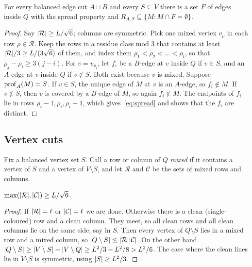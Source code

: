 \begin{lemma}\label{lem:select-edge}
For every balanced edge cut $A\sqcup B$ and every $S\subseteq V$ there is a set $F$ of edges inside $Q$ with the spread property and $R_{A,S}\subseteq\{M:M\cap F=\emptyset\}$.
\end{lemma}

\begin{proof}
Say $\lvert \mathcal R\rvert\ge L/\sqrt6$; columns are symmetric. Pick one mixed vertex $v_\rho$ in each row $\rho\in\mathcal R$. Keep the rows in a residue class mod $3$ that contains at least $\lvert \mathcal R\rvert/3\ge L/(3\sqrt6)$ of them, and index them $\rho_1<\rho_2<\dots<\rho_t$, so that $\rho_j-\rho_i\ge3(j-i)$. For $v=v_{\rho_i}$, let $f_i$ be a $B$-edge at $v$ inside $Q$ if $v\in S$, and an $A$-edge at $v$ inside $Q$ if $v\notin S$. Both exist because $v$ is mixed. Suppose $\operatorname{prof}_A(M)=S$. If $v\in S$, the unique edge of $M$ at $v$ is an $A$-edge, so $f_i\notin M$. If $v\notin S$, then $v$ is covered by a $B$-edge of $M$, so again $f_i\notin M$. The endpoints of $f_i$ lie in rows $\rho_i-1,\rho_i,\rho_i+1$, which gives~\eqref{eq:spread} and shows that the $f_i$ are distinct.
\end{proof}

\subsection{Vertex cuts}

Fix a balanced vertex set $S$. Call a row or column of $Q$ \emph{mixed} if it contains a vertex of $S$ and a vertex of $V\setminus S$, and let $\mathcal R$ and $\mathcal C$ be the sets of mixed rows and columns.

\begin{lemma}\label{lem:mixed-vertex}
$\max(\lvert \mathcal R\rvert,\lvert \mathcal C\rvert)\ge L/\sqrt6$.
\end{lemma}

\begin{proof}
If $\lvert \mathcal R\rvert=\ell$ or $\lvert \mathcal C\rvert=\ell$ we are done. Otherwise there is a clean (single-coloured) row and a clean column. They meet, so all clean rows and all clean columns lie on the same side, say in $S$. Then every vertex of $Q\setminus S$ lies in a mixed row and a mixed column, so $\lvert Q\setminus S\rvert\le\lvert \mathcal R\rvert\lvert \mathcal C\rvert$. On the other hand $\lvert Q\setminus S\rvert\ge\lvert V\setminus S\rvert-\lvert V\setminus Q\rvert\ge L^2/3-L^2/8>L^2/6$. The case where the clean lines lie in $V\setminus S$ is symmetric, using $\lvert S\rvert\ge L^2/3$.
\end{proof}

